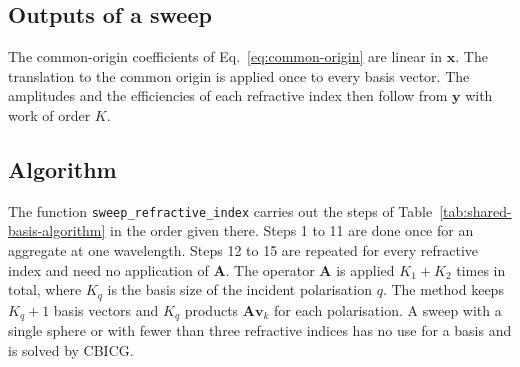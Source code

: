 \documentclass[11pt,a4paper]{article}
\begin{document}
\subsection{Outputs of a sweep}
The common-origin coefficients of Eq.~\eqref{eq:common-origin} are linear in $\bm{x}$.
The translation to the common origin is applied once to every basis vector.
The amplitudes and the efficiencies of each refractive index then follow from $\bm{y}$ with work of order $K$.

\subsection{Algorithm}
The function \texttt{sweep\_refractive\_index} carries out the steps of Table~\ref{tab:shared-basis-algorithm} in the order given there.
Steps 1 to 11 are done once for an aggregate at one wavelength.
Steps 12 to 15 are repeated for every refractive index and need no application of $\mathbf{A}$.
The operator $\mathbf{A}$ is applied $K_1 + K_2$ times in total, where $K_q$ is the basis size of the incident polarisation $q$.
The method keeps $K_q + 1$ basis vectors and $K_q$ products $\mathbf{A}\bm{v}_k$ for each polarisation.
A sweep with a single sphere or with fewer than three refractive indices has no use for a basis and is solved by CBICG.
\end{document}
